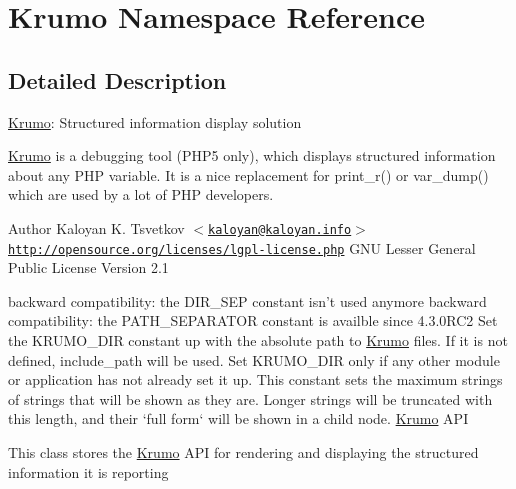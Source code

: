 \hypertarget{namespaceKrumo}{
\section{Krumo Namespace Reference}
\label{namespaceKrumo}
}


\subsection{Detailed Description}
\hyperlink{namespaceKrumo}{Krumo}: Structured information display solution

\hyperlink{namespaceKrumo}{Krumo} is a debugging tool (PHP5 only), which displays structured information about any PHP variable. It is a nice replacement for print\_\-r() or var\_\-dump() which are used by a lot of PHP developers.

\begin{DoxyAuthor}{Author}
Kaloyan K. Tsvetkov $<$\href{mailto:kaloyan@kaloyan.info}{\tt kaloyan@kaloyan.info}$>$  \href{http://opensource.org/licenses/lgpl-license.php}{\tt http://opensource.org/licenses/lgpl-\/license.php} GNU Lesser General Public License Version 2.1
\end{DoxyAuthor}
backward compatibility: the DIR\_\-SEP constant isn't used anymore backward compatibility: the PATH\_\-SEPARATOR constant is availble since 4.3.0RC2 Set the KRUMO\_\-DIR constant up with the absolute path to \hyperlink{namespaceKrumo}{Krumo} files. If it is not defined, include\_\-path will be used. Set KRUMO\_\-DIR only if any other module or application has not already set it up. This constant sets the maximum strings of strings that will be shown as they are. Longer strings will be truncated with this length, and their `full form` will be shown in a child node. \hyperlink{namespaceKrumo}{Krumo} API

This class stores the \hyperlink{namespaceKrumo}{Krumo} API for rendering and displaying the structured information it is reporting 